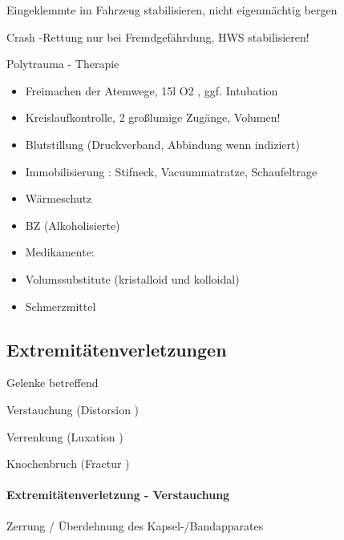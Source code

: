 \documentclass{article}
\begin{document}
{\mdseries
Eingeklemmte im Fahrzeug stabilisieren,  nicht eigenm\"achtig bergen}

{\mdseries
Crash -Rettung nur  bei  Fremdgef\"ahrdung, HWS stabilisieren!}

{\mdseries\color{black}
Polytrauma - Therapie}

\begin{itemize}
\item {\mdseries\color[rgb]{0.0,0.0,0.5019608}
Freimachen der Atemwege, 15l O2 , ggf.  Intubation}

\item {\mdseries\color[rgb]{0.0,0.0,0.5019608}
Kreislaufkontrolle, 2 gro{\ss}lumige Zug\"ange,  Volumen!}

\item {\mdseries\color[rgb]{0.0,0.0,0.5019608}
Blutstillung  (Druckverband, Abbindung wenn  indiziert)}

\item {\mdseries\color[rgb]{0.0,0.0,0.5019608}
Immobilisierung : Stifneck, Vacuummatratze,  Schaufeltrage}

\item {\mdseries\color[rgb]{0.0,0.0,0.5019608}
W\"armeschutz}

\item {\mdseries\color[rgb]{0.0,0.0,0.5019608}
BZ (Alkoholisierte)}

\item {\mdseries\color[rgb]{0.0,0.0,0.5019608}
Medikamente: }

\item {\mdseries\color[rgb]{0.0,0.0,0.5019608}
Volumssubstitute (kristalloid und kolloidal)}

\item {\mdseries\color[rgb]{0.0,0.0,0.5019608}
Schmerzmittel}

\end{itemize}
\subsection{Extremit\"atenverletzungen}
{\mdseries
Gelenke betreffend}

{\mdseries
Verstauchung (Distorsion )}

{\mdseries
Verrenkung (Luxation )}

{\mdseries
Knochenbruch (Fractur )}

\paragraph{Extremit\"atenverletzung - Verstauchung}
{\mdseries
Zerrung / \"Uberdehnung des  Kapsel-/Bandapparates}
\end{document}
